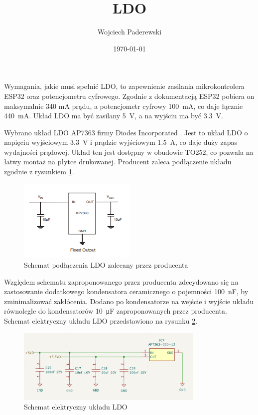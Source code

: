 \documentclass[../../main.tex]{subfiles}
\author{Wojciech Paderewski}
\date{\today}
\title{LDO}
\begin{document}
Wymagania, jakie musi spełnić LDO, to zapewnienie zasilania mikrokontrolera ESP32 oraz potencjometru cyfrowego.
Zgodnie z dokumentacją ESP32 \cite{st:esp32} pobiera on maksymalnie 340 mA prądu, a potencjometr cyfrowy \cite{st:potencjometr} \SI{100}{\milli\ampere},
co daje łącznie \SI{440}{\milli\ampere}. Układ LDO ma być zasilany \SI{5}{\volt}, a na wyjściu ma być \SI{3.3}{\volt}.

Wybrano układ LDO AP7363 firmy Diodes Incorporated \cite{st:ldo}. Jest to układ LDO o napięciu wyjściowym \SI{3.3}{\volt} i prądzie wyjściowym \SI{1.5}{\ampere},
co daje duży zapas wydajności prądowej. Układ ten jest dostępny w obudowie TO252, co pozwala na łatwy montaż na płytce drukowanej. Producent zaleca podłączenie układu
zgodnie z rysunkiem \ref{fig:ldo_datasheet}.

\begin{figure}[H]
    \centering
    \includegraphics[width=0.5\textwidth]{ldo_datasheet.png}
    \caption{Schemat podłączenia LDO zalecany przez producenta \cite{st:ldo}}
    \label{fig:ldo_datasheet}
\end{figure}

Względem schematu zaproponowanego przez producenta zdecydowano się na zastosowanie dodatkowego kondensatora ceramicznego o pojemności \SI{100}{\nano\farad}, by zminimalizować zakłócenia.
Dodano po kondensatorze na wejście i wyjście układu równolegle do kondensatorów \SI{10}{\micro\farad} zaproponowanych przez producenta. 
Schemat elektryczny układu LDO przedstawiono na rysunku \ref{fig:ldo}.

\begin{figure}[H]
    \centering
    \includegraphics[width=0.8\textwidth]{LDO.png}
    \caption{Schemat elektryczny układu LDO}
    \label{fig:ldo}
\end{figure}
\end{document}
